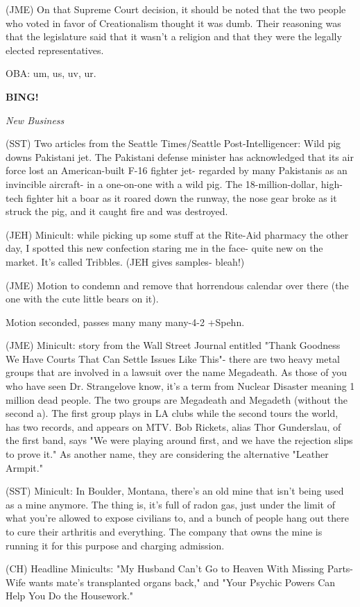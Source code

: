 \documentclass[12pt]{article}
\newcommand{\bing}{{\bf BING!} }
\newcommand{\goto}[1]{\bing \vskip 12pt \centerline{{\em{#1}}}}
\begin{document}
(JME) On that Supreme Court decision, it should be noted that the two people who voted in favor of Creationalism thought it was dumb. Their reasoning was that the legislature said that it wasn't a religion and that they were the legally elected representatives.

OBA: um, us, uv, ur.

\goto{New Business}

(SST) Two articles from the Seattle Times/Seattle Post-Intelligencer: Wild pig downs Pakistani jet. The Pakistani defense minister has acknowledged that its air force lost an American-built F-16 fighter jet- regarded by many Pakistanis as an invincible aircraft- in a one-on-one with a wild pig. The 18-million-dollar, high-tech fighter hit a boar as it roared down the runway, the nose gear broke as it struck the pig, and it caught fire and was destroyed.

(JEH) Minicult: while picking up some stuff at the Rite-Aid pharmacy the other day, I spotted this new confection staring me in the face- quite new on the market. It's called Tribbles. (JEH gives samples- bleah!)

(JME) Motion to condemn and remove that horrendous calendar over there (the one with the cute little bears on it).

Motion seconded, passes many many many-4-2 +Spehn.

(JME) Minicult: story from the Wall Street Journal entitled "Thank Goodness We Have Courts That Can Settle Issues Like This"- there are two heavy metal groups that are involved in a lawsuit over the name Megadeath. As those of you who have seen Dr. Strangelove know, it's a term from Nuclear Disaster meaning 1 million dead people. The two groups are Megadeath and Megadeth (without the second a). The first group plays in LA clubs while the second tours the world, has two records, and appears on MTV. Bob Rickets, alias Thor Gunderslau, of the first band, says "We were playing around first, and we have the rejection slips to prove it." As another name, they are considering the alternative "Leather Armpit."

(SST) Minicult: In Boulder, Montana, there's an old mine that isn't being used as a mine anymore. The thing is, it's full of radon gas, just under the limit of what you're allowed to expose civilians to, and a bunch of people hang out there to cure their arthritis and everything. The company that owns the mine is running it for this purpose and charging admission.

(CH) Headline Minicults: "My Husband Can't Go to Heaven With Missing Parts- Wife wants mate's transplanted organs back," and "Your Psychic Powers Can Help You Do the Housework."
\end{document}

